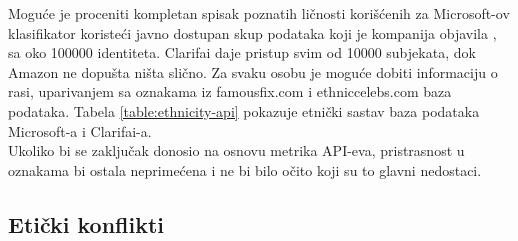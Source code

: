\documentclass[11pt, a4paper]{article}
\begin{document}
\indent Moguće je proceniti kompletan spisak poznatih ličnosti korišćenih za Microsoft-ov klasifikator koristeći javno dostupan skup podataka koji je kompanija objavila \cite{G21}, sa oko 100000 identiteta. Clarifai daje pristup svim od 10000 subjekata, dok Amazon ne dopušta ništa slično. Za svaku osobu je moguće dobiti informaciju o rasi, uparivanjem sa oznakama iz famousfix.com i ethniccelebs.com baza podataka. Tabela \ref{table:ethnicity-api} pokazuje etnički sastav baza podataka Microsoft-a i Clarifai-a. \\
\indent Ukoliko bi se zaključak donosio na osnovu metrika API-eva, pristrasnost u oznakama bi ostala neprimećena i ne bi bilo očito koji su to glavni nedostaci.

\subsection{Etički konflikti}
\end{document}
